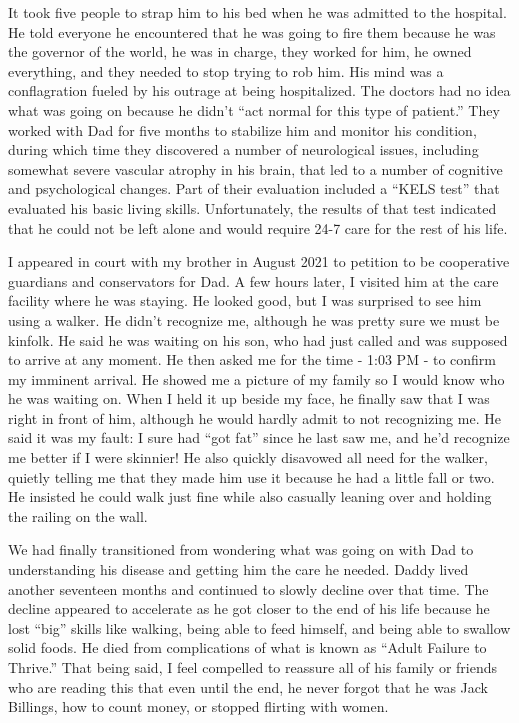 \documentclass{article}
\begin{document}
It took five people to strap him to his bed when he was admitted to the hospital. He told everyone he encountered that he was going to fire them because he was the governor of the world, he was in charge, they worked for him, he owned everything, and they needed to stop trying to rob him. His mind was a conflagration fueled by his outrage at being hospitalized. The doctors had no idea what was going on because he didn't ``act normal for this type of patient.'' They worked with Dad for five months to stabilize him and monitor his condition, during which time they discovered a number of neurological issues, including somewhat severe vascular atrophy in his brain, that led to a number of cognitive and psychological changes. Part of their evaluation included a ``KELS test'' that evaluated his basic living skills. Unfortunately, the results of that test indicated that he could not be left alone and would require 24-7 care for the rest of his life.

I appeared in court with my brother in August 2021 to petition to be cooperative guardians and conservators for Dad. A few hours later, I visited him at the care facility where he was staying. He looked good, but I was surprised to see him using a walker. He didn't recognize me, although he was pretty sure we must be kinfolk. He said he was waiting on his son, who had just called and was supposed to arrive at any moment. He then asked me for the time - 1:03 PM - to confirm my imminent arrival. He showed me a picture of my family so I would know who he was waiting on. When I held it up beside my face, he finally saw that I was right in front of him, although he would hardly admit to not recognizing me. He said it was my fault: I sure had ``got fat'' since he last saw me, and he'd recognize me better if I were skinnier! He also quickly disavowed all need for the walker, quietly telling me that they made him use it because he had a little fall or two. He insisted he could walk just fine while also casually leaning over and holding the railing on the wall.

We had finally transitioned from wondering what was going on with Dad to understanding his disease and getting him the care he needed. Daddy lived another seventeen months and continued to slowly decline over that time. The decline appeared to accelerate as he got closer to the end of his life because he lost ``big'' skills like walking, being able to feed himself, and being able to swallow solid foods. He died from complications of what is known as ``Adult Failure to Thrive.'' That being said, I feel compelled to reassure all of his family or friends who are reading this that even until the end, he never forgot that he was Jack Billings, how to count money, or stopped flirting with women.
\end{document}

